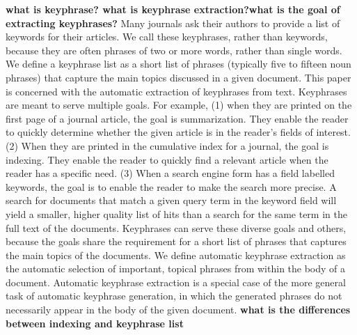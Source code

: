\textbf{what is keyphrase? what is keyphrase extraction?what is the goal of extracting keyphrases?}
Many journals ask their authors to provide a list of keywords for their articles. We call these keyphrases, rather than keywords, because they are often phrases of two or more words, rather than single words. We define a keyphrase list as a short list of phrases (typically five to fifteen noun phrases) that capture the main topics discussed in a given document. This paper is concerned with the automatic extraction of keyphrases from text.
Keyphrases are meant to serve multiple goals. For example, (1) when they are printed on the first page of a journal article, the goal is summarization. They enable the reader to quickly determine whether the given article is in the reader’s fields of interest. (2) When they are printed in the cumulative index for a journal, the goal is indexing. They enable the reader to quickly find a relevant article when the reader has a specific need. (3) When a search engine form has a field labelled keywords, the goal is to enable the reader to make the search more precise. A search for documents that match a given query term in the keyword field will yield a smaller, higher quality list of hits than a search for the same term in the full text of the documents. Keyphrases can serve these diverse goals and others, because the goals share the requirement for a short list of phrases that captures the main topics of the documents.
We define automatic keyphrase extraction as the automatic selection of important, topical phrases from within the body of a document. Automatic keyphrase extraction is a special case of the more general task of automatic keyphrase generation, in which the generated phrases do not necessarily appear in the body of the given document. 
\textbf{what is the differences between indexing and keyphrase list}

